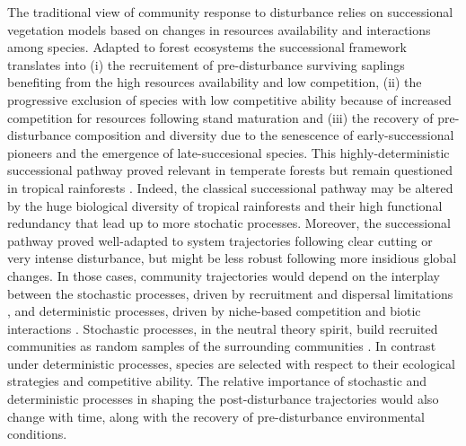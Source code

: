 \documentclass[fleqn,10pt]{ArtEcoFoG} %
\begin{document}
The traditional view of community response to disturbance relies on
successional vegetation models \citep{Clements1916} based on changes in
resources availability and interactions among species. Adapted to forest
ecosystems the successional framework translates into
\citep{Denslow2000} (i) the recruitement of pre-disturbance surviving
saplings benefiting from the high resources availability and low
competition, (ii) the progressive exclusion of species with low
competitive ability because of increased competition for resources
following stand maturation and (iii) the recovery of pre-disturbance
composition and diversity due to the senescence of early-successional
pioneers and the emergence of late-succesional species. This
highly-deterministic successional pathway proved relevant in temperate
forests but remain questioned in tropical rainforests
\citep{Norden2015}. Indeed, the classical successional pathway may be
altered by the huge biological diversity of tropical rainforests and
their high functional redundancy that lead up to more stochatic
processes. Moreover, the successional pathway proved well-adapted to
system trajectories following clear cutting or very intense disturbance,
but might be less robust following more insidious global changes. In
those cases, community trajectories would depend on the interplay
between the stochastic processes, driven by recruitment and dispersal
limitations \citep{Hurtt1995, Hubbell2001}, and deterministic processes,
driven by niche-based competition and biotic interactions
\citep{Adler2007}. Stochastic processes, in the neutral theory spirit,
build recruited communities as random samples of the surrounding
communities \citep{Hubbell2001, Chave2004}. In contrast under
deterministic processes, species are selected with respect to their
ecological strategies and competitive ability. The relative importance
of stochastic and deterministic processes in shaping the
post-disturbance trajectories would also change with time, along with
the recovery of pre-disturbance environmental conditions.
\end{document}

